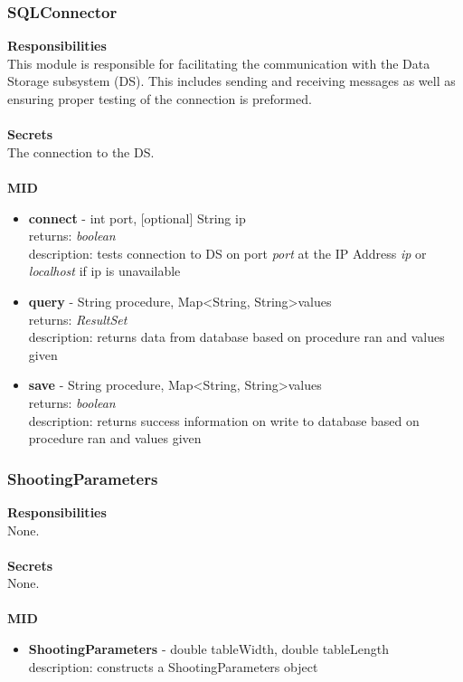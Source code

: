 \documentclass[11pt]{article}
\begin{document}
\subsubsection*{SQLConnector}
\textbf{Responsibilities} \\
This module is responsible for facilitating the communication with the Data Storage subsystem (DS). This includes sending and receiving messages as well as ensuring proper testing of the connection is preformed. \\ \\
\textbf{Secrets} \\
The connection to the DS. \\ \\
\textbf{MID}
\begin{itemize}
\item \textbf{connect} - int port, [optional] String ip \\ returns: \textit{boolean} \\ description: tests connection to DS on port \textit{port} at the IP Address \textit{ip} or \textit{localhost} if ip is unavailable
\item \textbf{query} - String procedure, Map\textless String, String\textgreater values \\ returns: \textit{ResultSet} \\ description: returns data from database based on procedure ran and values given
\item \textbf{save} - String procedure, Map\textless String, String\textgreater values \\ returns: \textit{boolean} \\ description: returns success information on write to database based on procedure ran and values given
\end{itemize}

\subsubsection*{ShootingParameters}
\textbf{Responsibilities} \\
None. \\ \\
\textbf{Secrets} \\
None. \\ \\
\textbf{MID}
\begin{itemize}
\item \textbf{ShootingParameters} - double tableWidth, double tableLength \\ description: constructs a ShootingParameters object
\end{itemize}
\end{document}
